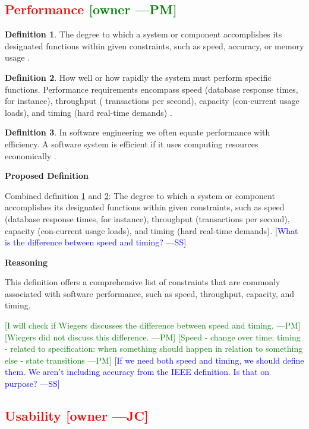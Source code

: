 \documentclass[letterpaper,cleveref]{lipics-v2019}
\newcommand{\authornote}[3]{\textcolor{#1}{[#3 ---#2]}}
\newcommand{\authornote}[3]{}
\newcommand{\wss}[1]{\authornote{blue}{SS}{#1}} %
\newcommand{\jc}[1]{\authornote{red}{JC}{#1}} %
\newcommand{\pmi}[1]{\authornote{green}{PM}{#1}} %
\newcommand{\notdone}[1]{\textcolor{red}{#1}}
\theoremstyle{definition}
\newtheorem{defn}{Definition}
\begin{document}
\subsection{\notdone{Performance} \pmi{owner}}

\begin{defn} \label{PerformanceDefnSelected}
	The degree to which a system or component accomplishes its designated functions
	within given constraints, such as speed, accuracy, or memory usage
	\citep{IEEEStdGlossarySET1990}.
\end{defn}
\begin{defn} \label{PerformanceDefnSelected2}
	How well or how rapidly the system must perform specific functions. Performance
	requirements encompass speed (database response times, for instance), throughput
	( transactions per second), capacity (con-current usage loads), and timing (hard
	real-time demands) \citep{wiegers2003softreq}.
\end{defn}
\begin{defn}
	In software engineering we often equate performance with efficiency. A software
	system is efficient if it uses computing resources economically
	\citep{ghezzi1991fundamentals}.
\end{defn}

\noindent \textbf{Proposed Definition}

Combined definition \ref{PerformanceDefnSelected} and
\ref{PerformanceDefnSelected2}: The degree to which a system or component
accomplishes its designated functions within given constraints, such as speed
(database response times, for instance), throughput (transactions per second),
capacity (con-current usage loads), and timing (hard real-time
demands). \wss{What is the difference between speed and timing?}

\noindent \textbf{Reasoning}

This definition offers a comprehensive list of constraints that are commonly
associated with software performance, such as speed, throughput, capacity, and
timing.

\pmi{I will check if Wiegers discusses the difference between speed and timing.}
\pmi{Wiegers did not discuss this difference.}
\pmi{Speed - change over time; timing - related to specification: when something
	should happen in relation to something else - state transitions}
\wss{If we need both speed and timing, we should define them.  We aren't
  including accuracy from the IEEE definition.  Is that on purpose?}

\subsection{\notdone{Usability} \jc{owner}} 
\end{document}
